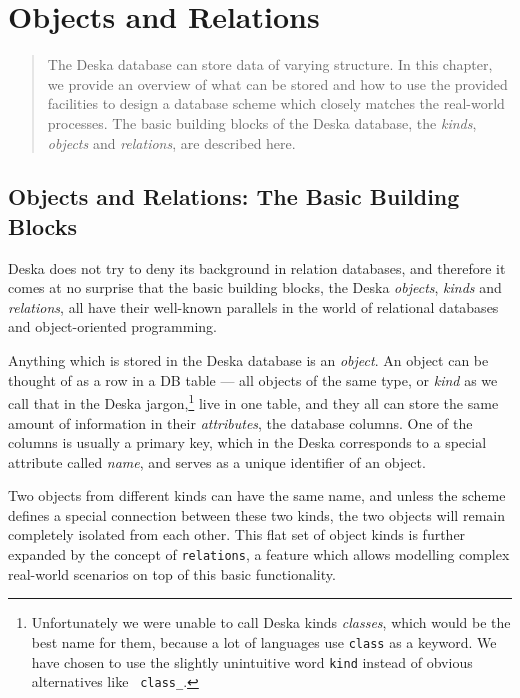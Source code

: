 \documentclass[deska]{subfiles}
\begin{document}
\chapter{Objects and Relations}

\begin{abstract}
The Deska database can store data of varying structure.  In this chapter, we provide an overview of what can be stored
and how to use the provided facilities to design a database scheme which closely matches the real-world processes.  The
basic building blocks of the Deska database, the {\em kinds}, {\em objects} and {\em relations}, are described here.
\end{abstract}

\section{Objects and Relations: The Basic Building Blocks}
\label{sec:objects-and-relations}

Deska does not try to deny its background in relation databases, and therefore it comes at no surprise that the basic
building blocks, the Deska {\em objects}, {\em kinds} and {\em relations}, all have their well-known parallels in the
world of relational databases and object-oriented programming.

Anything which is stored in the Deska database is an {\em object}. An object can be thought of as a row in a DB table ---
all objects of the same type, or {\em kind} as we call that in the Deska jargon,\footnote{Unfortunately we were unable
to call Deska kinds {\em classes}, which would be the best name for them, because a lot of languages use {\tt class} as
a keyword.  We have chosen to use the slightly unintuitive word {\tt kind} instead of obvious alternatives like {\tt
class\_}.} live in one table, and they all can
store the same amount of information in their {\em attributes}, the database columns.  One of the columns is usually a
primary key, which in the Deska corresponds to a special attribute called {\em name}, and serves as a unique identifier
of an object.

Two objects from different kinds can have the same name, and unless the scheme defines a special connection between
these two kinds, the two objects will remain completely isolated from each other.  This flat set of object kinds is
further expanded by the concept of {\tt relations}, a feature which allows modelling complex real-world scenarios on top
of this basic functionality.
\end{document}
